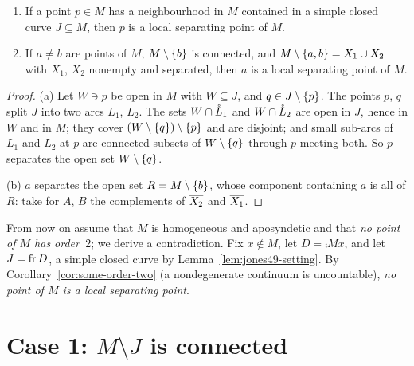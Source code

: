 
\begin{lemma}\label{lem:local-sep}
\leavevmode
\begin{enumerate}[label=(\alph*)]
\item If a point $p\in M$ has a neighbourhood in $M$ contained in a simple closed curve $J\subseteq M$, then $p$ is a local separating point of $M$.
\item If $a\ne b$ are points of $M$, $M\setminus\left\{ b \right\}$ is connected, and $M\setminus\left\{ a,b \right\}=X_1\cup X_2$ with $X_1$, $X_2$ nonempty and separated, then $a$ is a local
separating point of $M$.
\end{enumerate}
\end{lemma}

\begin{proof}
(a) Let $W\ni p$ be open in $M$ with $W\subseteq J$, and $q\in J\setminus\left\{ p \right\}$. The points $p$, $q$ split $J$ into two arcs $L_1$, $L_2$. The sets $W\cap\mathring{L}_1$ and $W\cap\mathring{L}_2$ are open in $J$, hence in $W$ and in $M$;
they cover $(W\setminus\left\{ q \right\})\setminus\left\{ p \right\}$ and are disjoint; and small sub-arcs of $L_1$ and $L_2$ at $p$ are connected subsets of $W\setminus\left\{ q \right\}$ through $p$ meeting both. So $p$ separates the open set
$W\setminus\left\{ q \right\}$.

(b) $a$ separates the open set $R=M\setminus\left\{ b \right\}$, whose component containing $a$ is all of $R$: take for $A$, $B$ the complements of $\overline{X_2}$ and $\overline{X_1}$.
\end{proof}


From now on assume that $M$ is homogeneous and aposyndetic and that \emph{no point of $M$ has order~$2$}; we derive a contradiction. Fix $x\notin M$, let
$D=\comp Mx$, and let $J=\operatorname{fr} D$, a simple closed curve by Lemma~\ref{lem:jones49-setting}. By Corollary~\ref{cor:some-order-two} (a nondegenerate continuum is
uncountable), \emph{no point of $M$ is a local separating point}.

\section{Case 1: \texorpdfstring{$M\setminus J$}{M - J} is connected}

